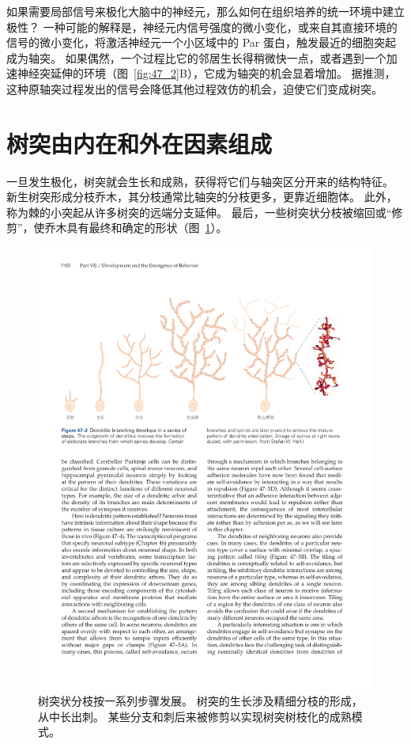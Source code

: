 如果需要局部信号来极化大脑中的神经元，那么如何在组织培养的统一环境中建立极性？
一种可能的解释是，神经元内信号强度的微小变化，或来自其直接环境的信号的微小变化，将激活神经元一个小区域中的 Par 蛋白，触发最近的细胞突起成为轴突。
如果偶然，一个过程比它的邻居生长得稍微快一点，或者遇到一个加速神经突延伸的环境（图~\ref{fig:47_2}B），它成为轴突的机会显着增加。
据推测，这种原轴突过程发出的信号会降低其他过程效仿的机会，迫使它们变成树突。



\section{树突由内在和外在因素组成}

一旦发生极化，树突就会生长和成熟，获得将它们与轴突区分开来的结构特征。
新生树突形成分枝乔木，其分枝通常比轴突的分枝更多，更靠近细胞体。
此外，称为棘的小突起从许多树突的远端分支延伸。
最后，一些树突状分枝被缩回或“修剪”，使乔木具有最终和确定的形状（图~\ref{fig:47_3}）。


\begin{figure}[htbp]
	\centering
	\includegraphics[width=1.0\linewidth]{chap47/fig_47_3}
	\caption{树突状分枝按一系列步骤发展。
		树突的生长涉及精细分枝的形成，从中长出刺。
		某些分支和刺后来被修剪以实现树突树枝化的成熟模式。}
	\label{fig:47_3}
\end{figure}


